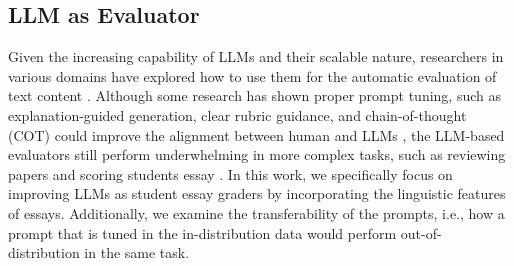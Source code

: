 \subsection{LLM as Evaluator}
\label{llm-as-evaluator}
Given the increasing capability of LLMs and their scalable nature, researchers in various domains have explored how to use them for the automatic evaluation of text content \cite{zubiaga-etal-2024-llm, alhafni-etal-2024-personalized, gao2024llmbasednlgevaluationcurrent, fu-etal-2024-gptscore}. Although some research has shown proper prompt tuning, such as explanation-guided generation, clear rubric guidance, and chain-of-thought (COT) could improve the alignment between human and LLMs \cite{chiang-lee-2023-closer, liu-etal-2023-g, hashemi-etal-2024-llm}, the LLM-based evaluators still perform underwhelming in more complex tasks, such as reviewing papers \cite{zhou-etal-2024-llm} and scoring students essay \cite{mansour-etal-2024-large, stahl-etal-2024-exploring}. In this work, we specifically focus on improving LLMs as student essay graders by incorporating the linguistic features of essays. Additionally, we examine the transferability of the prompts, i.e., how a prompt that is tuned in the in-distribution data would perform out-of-distribution in the same task.